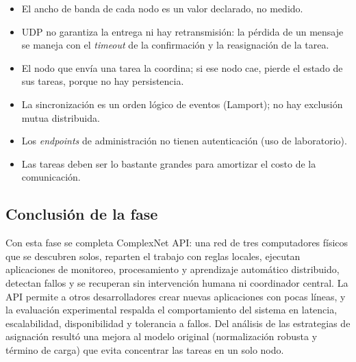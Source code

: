 \begin{itemize}
\item El ancho de banda de cada nodo es un valor declarado, no medido.
\item UDP no garantiza la entrega ni hay retransmisión: la pérdida de un mensaje se maneja con el
\emph{timeout} de la confirmación y la reasignación de la tarea.
\item El nodo que envía una tarea la coordina; si ese nodo cae, pierde el estado de sus tareas, porque
no hay persistencia.
\item La sincronización es un orden lógico de eventos (Lamport); no hay exclusión mutua distribuida.
\item Los \emph{endpoints} de administración no tienen autenticación (uso de laboratorio).
\item Las tareas deben ser lo bastante grandes para amortizar el costo de la comunicación.
\end{itemize}

\subsection{Conclusión de la fase}

Con esta fase se completa ComplexNet API: una red de tres computadores físicos que se descubren solos,
reparten el trabajo con reglas locales, ejecutan aplicaciones de monitoreo, procesamiento y
aprendizaje automático distribuido, detectan fallos y se recuperan sin intervención humana ni
coordinador central. La API permite a otros desarrolladores crear nuevas aplicaciones con pocas líneas,
y la evaluación experimental respalda el comportamiento del sistema en latencia, escalabilidad,
disponibilidad y tolerancia a fallos. Del análisis de las estrategias de asignación resultó una mejora
al modelo original (normalización robusta y término de carga) que evita concentrar las tareas en un
solo nodo.
